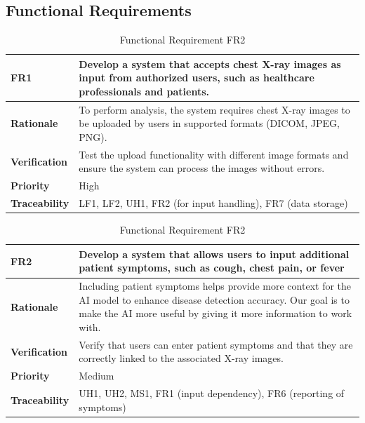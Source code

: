 \documentclass[12pt]{article}
\begin{document}
\subsection{Functional Requirements}
\begin{table}[h!]
\centering
{} %
\begin{tabular}{|p{3.5cm}|p{11.5cm}|}
\hline
\rowcolor{gray!30} %
\textbf{FR1} & Develop a system that accepts chest X-ray images as input from authorized users, such as healthcare professionals and patients. \\
\hline
\textbf{Rationale} & To perform analysis, the system requires chest X-ray images to be uploaded by users in supported formats (DICOM, JPEG, PNG). \\
\hline
\textbf{Verification} & Test the upload functionality with different image formats and ensure the system can process the images without errors. \\
\hline
\textbf{Priority} & High \\
\hline
\textbf{Traceability} & LF1, LF2, UH1, FR2 (for input handling), FR7 (data storage) \\
\hline
\end{tabular}
\caption{Functional Requirement FR1}
\centering
{}
\begin{tabular}{|p{3.5cm}|p{11.5cm}|}
\hline
\rowcolor{gray!30}
\textbf{FR2} & Develop a system that allows users to input additional patient symptoms, such as cough, chest pain, or fever \\
\hline
\textbf{Rationale} & Including patient symptoms helps provide more context for the AI model to enhance disease detection accuracy. Our goal is to make the AI more useful by giving it more information to work with. \\
\hline
\textbf{Verification} & Verify that users can enter patient symptoms and that they are correctly linked to the associated X-ray images. \\
\hline
\textbf{Priority} & Medium \\
\hline
\textbf{Traceability} & UH1, UH2, MS1, FR1 (input dependency), FR6 (reporting of symptoms) \\
\hline
\end{tabular}
\caption{Functional Requirement FR2}
\end{table}
\end{document}
